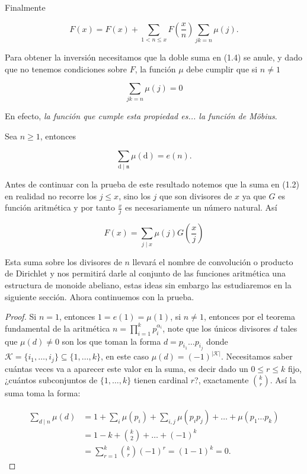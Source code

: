 Finalmente

\begin{equation}
F(x)=F(x)+\sum_{1<n\leq x}F \left( \frac{x}{n} \right)\sum_{jk=n}\mu(j).
\end{equation}

Para obtener la inversión necesitamos que la doble suma en (1.4) se anule, y dado que no tenemos condiciones sobre $F$, la función $\mu$ debe cumplir que si $n \neq 1$

$$\sum_{jk= n}\mu(j)=0$$

En efecto, \textit{la función que cumple esta propiedad es... la función de Möbius}.

\begin{theorem}
Sea $n \geqslant 1$, entonces

$$\sum_{\mathrm{d} \mid \mathfrak{n}} \mu(\mathrm{d})=e(n).$$

\end{theorem}
Antes de continuar con la prueba de este resultado notemos que la suma en (1.2) en realidad no recorre los $j\leqslant x$, sino los $j$ que son divisores de $x$ ya que $G$ es función aritmética y por tanto $\frac{x}{j}$ es necesariamente un número natural. Así

\begin{equation}
F(x)=\sum_{j \mid x} \mu(j) G\left(\frac{x}{j}\right)
\end{equation}

Esta suma sobre los divisores de $n$ llevará el nombre de convolución o producto de Dirichlet y nos permitirá darle al conjunto de las funciones aritmética una estructura de monoide abeliano, estas ideas sin embargo las estudiaremos en la  siguiente sección. Ahora continuemos con la prueba.\\

\begin{proof}

Si $n=1$, entonces $1=e(1)=\mu(1)$, si $n\neq 1$, entonces por el teorema fundamental de la aritmética $n=\displaystyle\prod_{i=1}^k p_i^{\alpha_i}$, note que los únicos divisores $d$ tales que $\mu(d)\neq 0$ son los que toman la forma $d=p_{i_1}\ldots p_{i_j}$ donde $\mathcal{K}=\{i_1,\ldots, i_j\}\subseteq \{1,\ldots,k\}$, en este caso $\mu(d)=(-1)^{|\mathcal{K}|}$. Necesitamos saber cuántas veces va a aparecer este valor en la suma, es decir dado un $0\leq r\leq k$ fijo, ¿cuántos subconjuntos de $\{1,\ldots,k\}$ tienen cardinal $r$?, exactamente $\displaystyle \binom{k}{r}$. Así la suma toma la forma:

\begin{align*}
    \sum_{d\mid n}\mu(d)&=1+\sum_{i}\mu(p_i)+\sum_{i,j}\mu(p_ip_j)+\ldots+\mu(p_1\ldots p_k)\\
    &=1-k+\binom{k}{2}+\ldots+(-1)^k\\
    &=\sum_{r=1}^k\binom{k}{r}(-1)^r=(1-1)^k=0
.\end{align*}

\end{proof}

